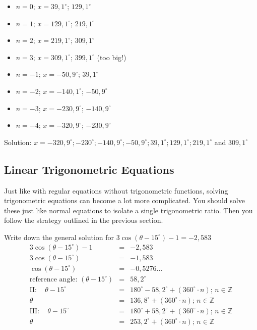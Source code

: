 \begin{itemize} 
\item $n=0$; $x=39,1^{\circ}$; $129,1^{\circ}$ 
\item $n=1$; $x=129,1^{\circ}$; $219,1^{\circ}$ 
\item $n=2$; $x=219,1^{\circ}$; $309,1^{\circ}$ 
\item $n=3$; $x=309,1^{\circ}$; $399,1^{\circ}$ (too big!) 
\item $n=-1$; $x=-50,9^{\circ}$; $39,1^{\circ}$ 
\item $n=-2$; $x=-140,1^{\circ}$; $-50,9^{\circ}$ 
\item $n=-3$; $x=-230,9^{\circ}$; $-140,9^{\circ}$ 
\item $n=-4$; $x=-320,9^{\circ}$; $-230,9^{\circ}$ 
\end{itemize} 
Solution: $x=-320,9^{\circ}; -230^{\circ}; -140,9^{\circ}; -50,9^{\circ}; 39,1^{\circ}; 129,1^{\circ}; 219,1^{\circ}$ and $309,1^{\circ}$

\subsection{Linear Trigonometric Equations}
Just like with regular equations without trigonometric functions, solving trigonometric equations can become a lot more complicated. You should solve these just like normal equations to isolate a single trigonometric ratio. Then you follow the strategy outlined in the previous section.

\begin{wex}{}
{%
Write down the general solution for $3\cos(\theta - 15^\circ)-1 = -2,583$
}
{%
\begin{eqnarray*} 
3\cos(\theta-15^{\circ})-1 &=& -2,583 \\
3\cos(\theta-15^{\circ}) &=& -1,583\\ 
\cos(\theta-15^{\circ}) &=& -0,5276\ldots\\
\mbox{reference angle: }(\theta-15^{\circ}) &=& 58,2^{\circ}\\ 
\mathrm{II:} \quad \theta-15^{\circ}&=&180^{\circ}-58,2^{\circ}+(360^{\circ}\cdot n) \mbox{; }n\in\mathbb{Z} \\ 
\theta&=&136,8^{\circ}+(360^{\circ}\cdot n)\mbox{; } n \in \mathbb{Z} \\ 
\mathrm{III:} \quad \theta-15^{\circ}&=&180^{\circ}+58,2^{\circ}+(360^{\circ}\cdot n) \mbox{; } n\in\mathbb{Z} \\ 
\theta&=&253,2^{\circ}+(360^{\circ}\cdot n) \mbox{; } n \in \mathbb{Z} \\ 
\end{eqnarray*}
}
\end{wex}

